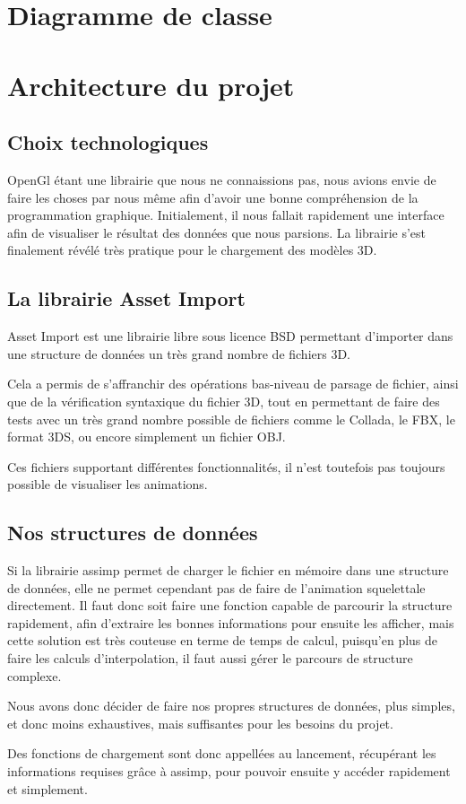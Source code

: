 \documentclass[a4paper]{report}
\begin{document}
\chapter{Diagramme de classe}


\newpage
\chapter{Architecture du projet}
\section{Choix technologiques}
OpenGl étant une librairie que nous ne connaissions pas, nous avions envie de faire les choses par nous même afin d'avoir une bonne compréhension de la programmation graphique. Initialement, il nous fallait rapidement une interface afin de visualiser le résultat des données que nous parsions. La librairie s'est finalement révélé très pratique pour le chargement des modèles 3D.
\section{La librairie Asset Import}
\par
Asset Import est une librairie libre sous licence BSD permettant d'importer dans une structure de données
un très grand nombre de fichiers 3D.
\par
Cela a permis de s'affranchir des opérations bas-niveau de parsage de fichier, ainsi que de la vérification 
syntaxique du fichier 3D, tout en permettant de faire des tests avec un très grand nombre possible de 
fichiers comme le Collada, le FBX, le format 3DS, ou encore simplement un fichier OBJ.
\par
Ces fichiers supportant différentes fonctionnalités, il n'est toutefois pas toujours possible de visualiser les animations.

\section{Nos structures de données}
\par
Si la librairie assimp permet de charger le fichier en mémoire dans une structure de données, elle ne permet 
cependant pas de faire de l'animation squelettale directement. Il faut donc soit faire une fonction capable 
de parcourir la structure rapidement, afin d'extraire les bonnes informations pour ensuite les afficher, mais
cette solution est très couteuse en terme de temps de calcul, puisqu'en plus de faire les calculs
d'interpolation, il faut aussi gérer le parcours de structure complexe.
\par
Nous avons donc décider de faire nos propres structures de données, plus simples, et donc moins exhaustives,
mais suffisantes pour les besoins du projet.
\par
Des fonctions de chargement sont donc appellées au lancement, récupérant les informations requises grâce à 
assimp, pour pouvoir ensuite y accéder rapidement et simplement.
\end{document}
